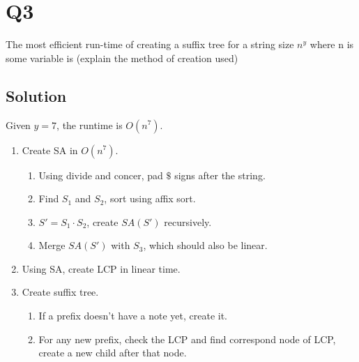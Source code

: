 
\section*{Q3}

The most efficient run-time of creating a suffix tree for a string size $n^y$ where n is some variable is
(explain the method of creation used)

\subsection*{Solution}

Given $y=7$, the runtime is $O(n^7)$.

\begin{enumerate}
    \item Create SA in $O(n^7)$.
          \begin{enumerate}
              \item Using divide and concer, pad $\$$ signs after the string.
              \item Find $S_1$ and $S_2$, sort using affix sort.
              \item $S' = S_1 \cdot S_2$, create $SA(S')$ recursively.
              \item Merge $SA(S')$ with $S_3$, which should also be linear.
          \end{enumerate}
    \item Using SA, create LCP in linear time.
    \item Create suffix tree.
          \begin{enumerate}
              \item If a prefix doesn't have a note yet, create it.
              \item For any new prefix, check the LCP and find correspond node of LCP, create a new child after that node.
          \end{enumerate}
\end{enumerate}